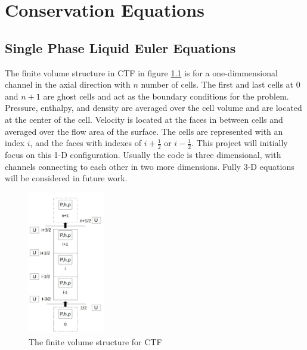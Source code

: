 \vspace*{-80mm}
\chapter{Conservation Equations} \label{chapter2:conservation_equations}
	
	
\section{Single Phase Liquid Euler Equations} \label{sec:euler_equations}
	
	The finite volume structure in CTF in figure \ref{fig:CTF-Cells} is for
	a one-dimmensional channel in the axial direction with $n$ number of cells.
	The first and last cells at $0$ and $n+1$ are ghost cells and act as the
	boundary conditions for the problem. Pressure, enthalpy, and density are
	averaged over the cell volume and are located at the center of the cell.
	Velocity is located at the faces in between cells and averaged over the flow
	area of the surface. The cells are represented with an index $i$, and the
	faces with indexes of $i+\frac{1}{2}$ or $i-\frac{1}{2}$. This project will
	initially focus on this 1-D configuration. Usually the code is three
	dimensional, with channels connecting to each other in two more dimensions.
	Fully 3-D equations will be considered in future work.
	
	\begin{figure}[!h]
		\centering
		\includegraphics[width=0.30\textwidth]{images/CTF-Cells}
		\caption{The finite volume structure for CTF}
		\label{fig:CTF-Cells}
	\end{figure}

